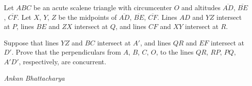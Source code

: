 Let $ABC$ be an acute scalene triangle with circumcenter $O$ and altitudes $\overline{AD}$, $\overline{BE}$, $\overline{CF}$. Let $X$, $Y$, $Z$ be the midpoints of $\overline{AD}$, $\overline{BE}$, $\overline{CF}$. Lines $AD$ and $YZ$ intersect at $P$, lines $BE$ and $ZX$ intersect at $Q$, and lines $CF$ and $XY$ intersect at $R$.

Suppose that lines $YZ$ and $BC$ intersect at $A'$, and lines $QR$ and $EF$ intersect at $D'$. Prove that the perpendiculars from $A$, $B$, $C$, $O$, to the lines $QR$, $RP$, $PQ$, $A'D'$, respectively, are concurrent.

\textit{Ankan Bhattacharya}